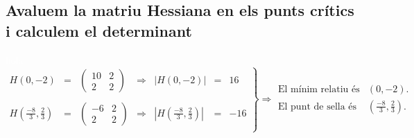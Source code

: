 \documentclass[12pt]{report}
\begin{document}
\subsection{Avaluem la matriu Hessiana en els punts crítics i calculem el determinant}
\textcolor{white}{hola}\\
$\left.
\begin{array}{ccccccc}
    H(0,-2) & = & \begin{pmatrix}
                    10 & 2 \\
                    2 & 2
                  \end{pmatrix} & \Rightarrow  &|H(0,-2)| & = & 16 \\
                  \\
    H\left(\frac{-8}{3},\frac{2}{3}\right) & = &
     \begin{pmatrix}
        -6 & 2 \\
         2 & 2
    \end{pmatrix} & \Rightarrow & |H\left(\frac{-8}{3},\frac{2}{3}\right)| & = & -16\\
\end{array}\right\}\Rightarrow \begin{array}{cc}
    \text{El mínim relatiu és} & (0,-2). \\
    \text{El punt de sella és} & \left(\frac{-8}{3},\frac{2}{3}\right).
\end{array}$
\end{document}
